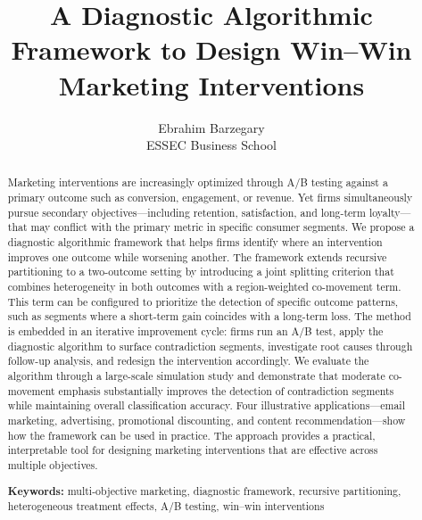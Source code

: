 \documentclass[11pt,letterpaper,english]{article}
\theoremstyle{definition}
\theoremstyle{definition}
\begin{document}
\title{A Diagnostic Algorithmic Framework to Design Win--Win Marketing Interventions}


\author{
       Ebrahim Barzegary \\
        ESSEC Business School\\
 }

\thispagestyle{empty}

\date{}
\maketitle

\begin{abstract} 

Marketing interventions are increasingly optimized through A/B testing against a primary outcome such as conversion, engagement, or revenue. Yet firms simultaneously pursue secondary objectives---including retention, satisfaction, and long-term loyalty---that may conflict with the primary metric in specific consumer segments. We propose a diagnostic algorithmic framework that helps firms identify where an intervention improves one outcome while worsening another. The framework extends recursive partitioning to a two-outcome setting by introducing a joint splitting criterion that combines heterogeneity in both outcomes with a region-weighted co-movement term. This term can be configured to prioritize the detection of specific outcome patterns, such as segments where a short-term gain coincides with a long-term loss. The method is embedded in an iterative improvement cycle: firms run an A/B test, apply the diagnostic algorithm to surface contradiction segments, investigate root causes through follow-up analysis, and redesign the intervention accordingly. We evaluate the algorithm through a large-scale simulation study and demonstrate that moderate co-movement emphasis substantially improves the detection of contradiction segments while maintaining overall classification accuracy. Four illustrative applications---email marketing, advertising, promotional discounting, and content recommendation---show how the framework can be used in practice. The approach provides a practical, interpretable tool for designing marketing interventions that are effective across multiple objectives.

\vspace{5mm}

\noindent \textbf{Keywords:} multi-objective marketing, diagnostic framework, recursive partitioning, heterogeneous treatment effects, A/B testing, win--win interventions

\end{abstract}
\end{document}
